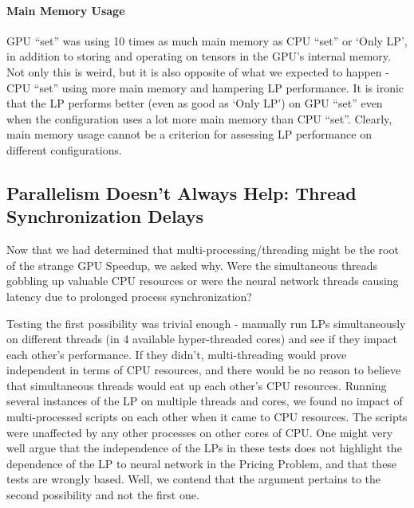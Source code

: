 \begin{appendices}
    \paragraph{Main Memory Usage} GPU ``set'' was using 10 times as much main memory as CPU ``set'' or `Only LP', in addition to storing and operating on tensors in the GPU's internal memory. Not only this is weird, but it is also opposite of what we expected to happen - CPU ``set'' using more main memory and hampering LP performance. It is ironic that the LP performs better (even as good as `Only LP') on GPU ``set'' even when the configuration uses a lot more main memory than CPU ``set''. Clearly, main memory usage cannot be a criterion for assessing LP performance on different configurations.
    
    \subsection{Parallelism Doesn't Always Help: Thread Synchronization Delays} \label{app:Parallelism Doesn't Always Help}
    Now that we had determined that multi-processing/threading might be the root of the strange GPU Speedup, we asked why. Were the simultaneous threads gobbling up valuable CPU resources or were the neural network threads causing latency due to prolonged process synchronization?
    
    Testing the first possibility was trivial enough - manually run LPs simultaneously on different threads (in 4 available hyper-threaded cores) and see if they impact each other's performance. If they didn't, multi-threading would prove independent in terms of CPU resources, and there would be no reason to believe that simultaneous threads would eat up each other's CPU resources. Running several instances of the LP on multiple threads and cores, we found no impact of multi-processed scripts on each other when it came to CPU resources. The scripts were unaffected by any other processes on other cores of CPU. One might very well argue that the independence of the LPs in these tests does not highlight the dependence of the LP to neural network in the Pricing Problem, and that these tests are wrongly based. Well, we contend that the argument pertains to the second possibility and not the first one. 
    

\end{appendices}
